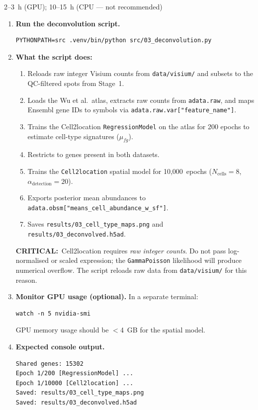 \documentclass[12pt, a4paper]{article}
\newcommand{\critical}[1]{\par\smallskip\noindent%
    {\color{red!65!black}\bfseries CRITICAL:}\ #1\par\smallskip}
\newcommand{\timing}[1]{%
    \begin{tcolorbox}[colback=orange!7,colframe=orange!55!black,
        fonttitle=\bfseries\small,title=Timing,
        boxrule=0.5pt,left=4pt,right=4pt,top=2pt,bottom=2pt,
        before upper=\small]
    #1
    \end{tcolorbox}\vspace{2pt}}
\begin{document}
\timing{2--3~h (GPU); 10--15~h (CPU — not recommended)}

\begin{enumerate}

\item \textbf{Run the deconvolution script.}
\begin{lstlisting}
PYTHONPATH=src .venv/bin/python src/03_deconvolution.py
\end{lstlisting}

\item \textbf{What the script does:}
\begin{enumerate}
    \item Reloads raw integer Visium counts from \texttt{data/visium/}
          and subsets to the QC-filtered spots from Stage~1.
    \item Loads the Wu et al.\ atlas, extracts raw counts from
          \texttt{adata.raw}, and maps Ensembl gene IDs to symbols via
          \texttt{adata.raw.var["feature\_name"]}.
    \item Trains the Cell2location \texttt{RegressionModel} on the
          atlas for 200 epochs to estimate cell-type signatures
          ($\hat{\mu}_{fg}$).
    \item Restricts to genes present in both datasets.
    \item Trains the \texttt{Cell2location} spatial model for
          10,000~epochs ($N_{\text{cells}} = 8$,
          $\alpha_{\text{detection}} = 20$).
    \item Exports posterior mean abundances to
          \texttt{adata.obsm["means\_cell\_abundance\_w\_sf"]}.
    \item Saves \texttt{results/03\_cell\_type\_maps.png} and
          \texttt{results/03\_deconvolved.h5ad}.
\end{enumerate}

\critical{Cell2location requires \emph{raw integer counts}.
Do not pass log-normalised or scaled expression; the
\texttt{GammaPoisson} likelihood will produce numerical overflow.
The script reloads raw data from \texttt{data/visium/} for this
reason.}

\item \textbf{Monitor GPU usage (optional).}
In a separate terminal:
\begin{lstlisting}
watch -n 5 nvidia-smi
\end{lstlisting}
GPU memory usage should be $<$4~GB for the spatial model.

\item \textbf{Expected console output.}
\begin{lstlisting}
Shared genes: 15302
Epoch 1/200 [RegressionModel] ...
Epoch 1/10000 [Cell2location] ...
Saved: results/03_cell_type_maps.png
Saved: results/03_deconvolved.h5ad
\end{lstlisting}


\end{enumerate}
\end{document}
